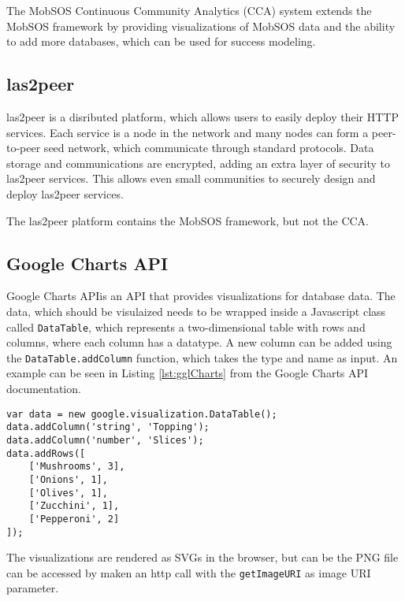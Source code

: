 The MobSOS Continuous Community Analytics (CCA) system extends the MobSOS framework by providing visualizations of MobSOS data and the ability to add more databases, which can be used for success modeling.

\subsection{las2peer}
las2peer is a disributed platform, which allows users to easily deploy their HTTP services. Each service is a node in the network and many nodes can form a peer-to-peer seed network, which communicate through standard protocols. Data storage and communications are encrypted, adding an extra layer of security to las2peer services. This allows even small communities to securely design and deploy las2peer services.

The las2peer platform contains the MobSOS framework, but not the CCA.

\subsection{Google Charts API}
Google Charts API\footnotemark is an API that provides visualizations for database data. The data, which should be visulaized needs to be wrapped inside a Javascript class called \texttt{DataTable}, which represents a two-dimensional table with rows and columns, where each column has a datatype.
A new column can be added using the \texttt{DataTable.addColumn} function, which takes the type and name as input. An example can be seen in Listing \ref{lst:gglCharts} from the Google Charts API documentation\footnotemark[\value{footnote}].

\begin{lstlisting}[caption=Example use of the DataTable class,captionpos=b,label={lst:gglCharts}]
var data = new google.visualization.DataTable();
data.addColumn('string', 'Topping');
data.addColumn('number', 'Slices');
data.addRows([
	['Mushrooms', 3],
	['Onions', 1],
	['Olives', 1], 
	['Zucchini', 1],
	['Pepperoni', 2]
]);
\end{lstlisting}


The visualizations are rendered as SVGs in the browser, but can be the PNG file can be accessed by maken an http call with the \texttt{getImageURI} as image URI parameter.


